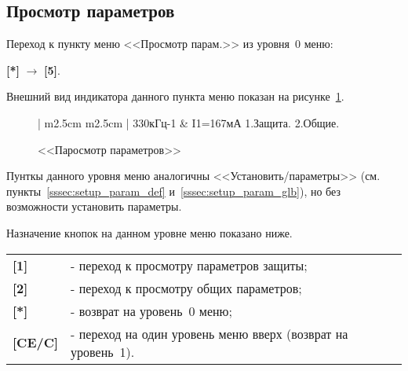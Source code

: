 \subsection{Просмотр параметров}	\label{ssec:view}

Переход к пункту меню <<Просмотр парам.>> из уровня~0 меню: 

\textbf{[*]} $\rightarrow$ \textbf{[5]}.

Внешний вид индикатора данного пункта меню показан на рисунке~\ref{fig:view_param}.
 
\begin{figure}[H]
	\centering
	
	\begin{tabular}{| m{2.5cm}  m{2.5cm} |}
		\firsthline
		330кГц-1	& \raggedleft I1=167мА		\tabularnewline 
		 {1.Защита.}		\tabularnewline
		 {2.Общие.} 		\tabularnewline 
		 {}					\tabularnewline 
		\lasthline
	\end{tabular} 
	
	\caption{<<Паросмотр параметров>>}
	\label{fig:view_param}
\end{figure}

Пунткы данного уровня меню  аналогичны <<Установить/параметры>> (см. пункты~\ref{sssec:setup_param_def} и~\ref{sssec:setup_param_glb}), но без возможности установить параметры.

Назначение кнопок на данном уровне меню показано ниже.
\begin{center}
	\begin{tabular}{p{2cm} p{15cm}}
		\textbf{[1]}  	& - переход к просмотру параметров защиты; \tabularnewline
		\textbf{[2]}	& - переход к просмотру общих параметров; \tabularnewline
		\textbf{[*]} 	& - возврат на уровень~0 меню; \tabularnewline
		\textbf{[CE/C]} & - переход на один уровень меню вверх (возврат на уровень~1). \tabularnewline				
	\end{tabular}
\end{center} 